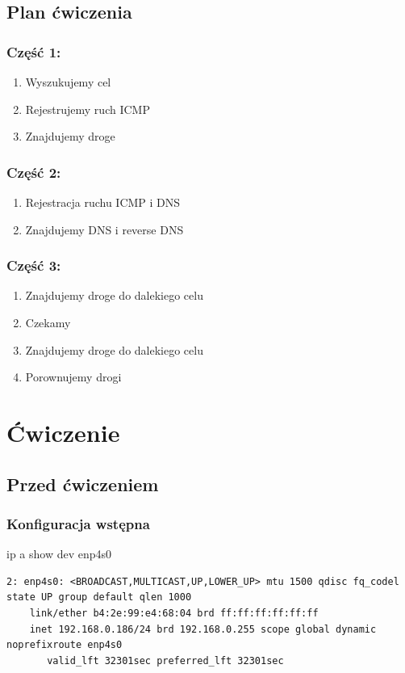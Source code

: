 \documentclass[11pt]{article}
\begin{document}
\subsection{Plan ćwiczenia}
\label{sec:orgfa8b94e}
\subsubsection{Część 1:}
\label{sec:org212af84}
\begin{enumerate}
\item Wyszukujemy cel
\item Rejestrujemy ruch ICMP
\item Znajdujemy droge
\end{enumerate}
\subsubsection{Część 2:}
\label{sec:org76964f3}
\begin{enumerate}
\item Rejestracja ruchu ICMP i DNS
\item Znajdujemy DNS i reverse DNS
\end{enumerate}
\subsubsection{Część 3:}
\label{sec:org89c3bbe}
\begin{enumerate}
\item Znajdujemy droge do dalekiego celu
\item Czekamy
\item Znajdujemy droge do dalekiego celu
\item Porownujemy drogi
\end{enumerate}


\section{Ćwiczenie}
\label{sec:orgb9d57ba}
\subsection{Przed ćwiczeniem}
\label{sec:orgbab222e}
\subsubsection{Konfiguracja wstępna}
\label{sec:org60f67a6}
ip a show dev enp4s0
\begin{verbatim}
2: enp4s0: <BROADCAST,MULTICAST,UP,LOWER_UP> mtu 1500 qdisc fq_codel state UP group default qlen 1000
    link/ether b4:2e:99:e4:68:04 brd ff:ff:ff:ff:ff:ff
    inet 192.168.0.186/24 brd 192.168.0.255 scope global dynamic noprefixroute enp4s0
       valid_lft 32301sec preferred_lft 32301sec
\end{verbatim}
\end{document}
